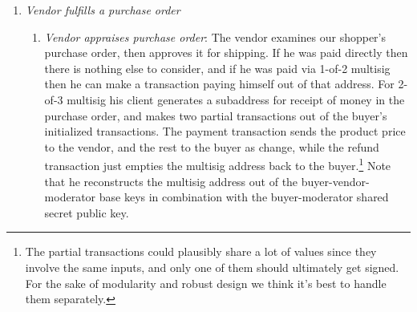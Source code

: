 \begin{enumerate}
\begin{enumerate}
        In reality, she only needs committed opening values for the two transactions, and then separately one copy of the partial key images (with proof of legitimacy) and one copy of her shopping-session subaddress. That subaddress has a dual purpose; it is the buyer's address for refunds or change outputs, and its spend key is the buyer's multisig base key.\footnote{It is important to initiate separate transactions, since committed opening values can only be used once.}
        \item {\em Buyer authorizes payment}: After looking over all the purchase order details, the shopper authorizes it.\footnote{If the buyer cancels the purchase order, her funding transaction and partial multisig transactions get deleted.} Her client finishes signing the funding transaction, and submits it to the network.\footnote{If her cart contained multiple vendors' products, then her client can create multiple purchase orders and handle them separately. The vendors can all be paid by the same funding transaction.} It sends the purchase order, along with the funding transaction's hash and initiated multisig transactions, and the buyer-moderator shared secret public key, to the vendor.\footnote{The buyer's client should keep track of payment order details like total price, to later verify the content of multisig transactions before signing them.}
    \end{enumerate}{}
    \item {\em Vendor fulfills a purchase order}
    \begin{enumerate}
        \item {\em Vendor appraises purchase order}: The vendor examines our shopper's purchase order, then approves it for shipping. If he was paid directly then there is nothing else to consider, and if he was paid via 1-of-2 multisig then he can make a transaction paying himself out of that address. For 2-of-3 multisig his client generates a subaddress for receipt of money in the purchase order, and makes two partial transactions out of the buyer's initialized transactions. The payment transaction sends the product price to the vendor, and the rest to the buyer as change, while the refund transaction just empties the multisig address back to the buyer.\footnote{The partial transactions could plausibly share a lot of values since they involve the same inputs, and only one of them should ultimately get signed. For the sake of modularity and robust design we think it's best to handle them separately.} Note that he reconstructs the multisig address out of the buyer-vendor-moderator base keys in combination with the buyer-moderator shared secret public key.

\end{enumerate}
\end{enumerate}
